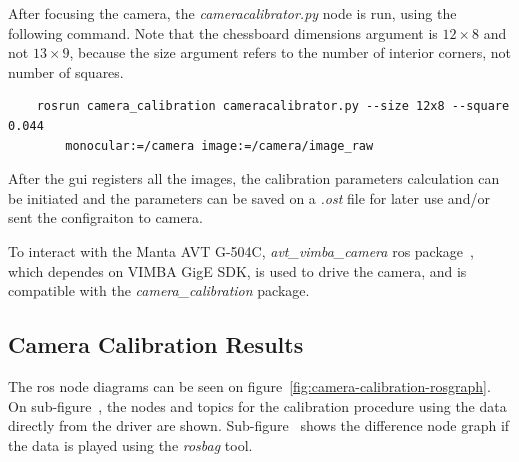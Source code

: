 After focusing the camera, the \emph{cameracalibrator.py} node is run, using the following command. Note that the chessboard dimensions argument is $12\times 8$ and not $13 \times 9$, because the size argument refers to the number of interior corners, not number of squares.


\begin{verbatim}
    rosrun camera_calibration cameracalibrator.py --size 12x8 --square 0.044  
        monocular:=/camera image:=/camera/image_raw
\end{verbatim}


After the \ac{gui} registers all the images, the calibration parameters calculation can be initiated and the parameters can be saved on a \textit{.ost} file for later use and/or sent the configraiton to camera. 

To interact with the Manta AVT G-504C, \emph{avt\_vimba\_camera} \ac{ros} package~\cite{AVTROSdriver}, which dependes on VIMBA GigE SDK, is used to drive the camera, and is compatible with the \emph{camera\_calibration} package. 

\subsection{Camera Calibration Results}
The \ac{ros} node diagrams can be seen on figure~\ref{fig:camera-calibration-rosgraph}. On sub-figure~, the nodes and topics for the calibration procedure using the data directly from the driver are shown. Sub-figure~ shows the difference node graph if the data is played using the \emph{rosbag} tool.

